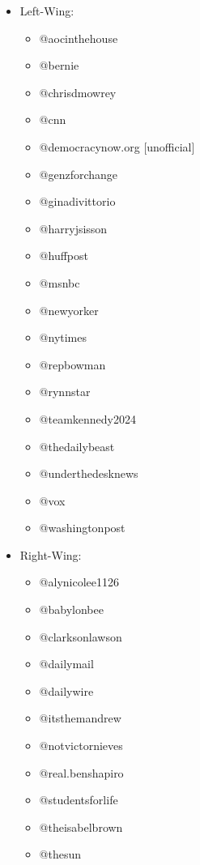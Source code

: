 \begin{itemize}
    \item Left-Wing: 
        \begin{itemize}
            \item @aocinthehouse \cite{wikiDem,yougovDem}
            \item @bernie \cite{wikiDem,yougovDem}
            \item @chrisdmowrey \cite{foxRight}
            \item @cnn \cite{biasCheck1,biasCheck2}
            \item @democracynow.org [unofficial]
            \item @genzforchange \cite{climateCulture}
            \item @ginadivittorio \cite{NYTpayInfluencers}
            \item @harryjsisson \cite{foxRight}
            \item @huffpost \cite{biasCheck1,biasCheck2}
            \item @msnbc \cite{biasCheck1,biasCheck2}
            \item @newyorker \cite{biasCheck1,biasCheck2}
            \item @nytimes \cite{biasCheck1,biasCheck2}
            \item @repbowman \cite{politico}
            \item @rynnstar \cite{https://doi.org/10.1002/poi3.287}
            \item @teamkennedy2024 \cite{wikiDem,yougovDem}
            \item @thedailybeast \cite{biasCheck1,biasCheck2}
            \item @underthedesknews \cite{foxRight}
            \item @vox \cite{biasCheck1,biasCheck2}
            \item @washingtonpost \cite{biasCheck1,biasCheck2}
        \end{itemize}
    \item Right-Wing:
        \begin{itemize}
            \item @alynicolee1126 \cite{mozilla}
            \item @babylonbee \cite{foxProFreeSpech}
            \item @clarksonlawson \cite{foxRight}
            \item @dailymail \cite{biasCheck1,biasCheck2}
            \item @dailywire \cite{biasCheck1,biasCheck2}
            \item @itsthemandrew \cite{mozilla}
            \item @notvictornieves \cite{foxRight}
            \item @real.benshapiro \cite{doi:10.1177/20563051231177938}
            \item @studentsforlife \cite{foxProFreeSpech}
            \item @theisabelbrown \cite{mozilla}
            \item @thesun \cite{biasCheck1,biasCheck2}
        \end{itemize}
\end{itemize}

